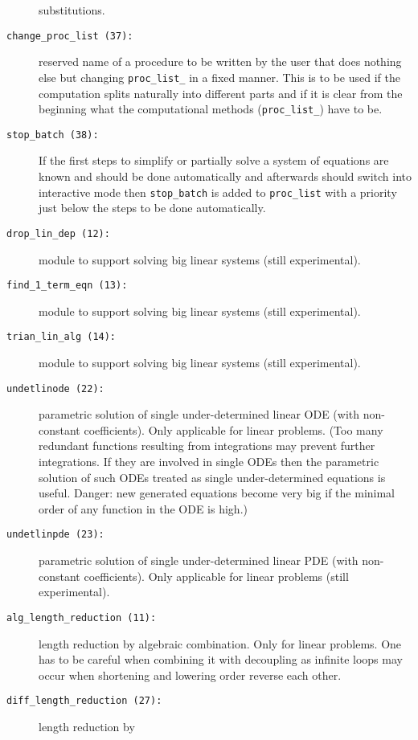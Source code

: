 \begin{description}
  substitutions.
  \label{crack-m_37}
\item[\texttt{change\_proc\_list (37):}] reserved name of a procedure
  to be written by the user that does nothing else but changing
  \texttt{proc\_list\_} in a fixed manner.  This is to be used if the
  computation splits naturally into different parts and if it is clear
  from the beginning what the computational methods
  (\texttt{proc\_list\_}) have to be.
  \label{crack-m_38}
\item[\texttt{stop\_batch (38):}] If the first steps to simplify or
  partially solve a system of equations are known and should be done
  automatically and afterwards  should switch into
  interactive mode then \texttt{stop\_batch} is added to
  \texttt{proc\_list} with a priority just below the steps to be done
  automatically.
  \label{crack-m_12}
\item[\texttt{drop\_lin\_dep (12):}] module to support solving big
  linear systems (still experimental).
  \label{crack-m_13}
\item[\texttt{find\_1\_term\_eqn (13):}] module to support solving big
  linear systems (still experimental).
  \label{crack-m_14}
\item[\texttt{trian\_lin\_alg (14):}] module to support solving big
  linear systems (still experimental).
  \label{crack-m_22}
\item[\texttt{undetlinode (22):}] parametric solution of single
  under-determined linear ODE (with non-constant coefficients).  Only
  applicable for linear problems.  (Too many redundant functions
  resulting from integrations may prevent further integrations.  If
  they are involved in single ODEs then the parametric solution of
  such ODEs treated as single under-determined equations is useful.
  Danger: new generated equations become very big if the minimal order
  of any function in the ODE is high.)
  \label{crack-m_23}
\item[\texttt{undetlinpde (23):}] parametric solution of single
  under-determined linear PDE (with non-constant coefficients).  Only
  applicable for linear problems (still experimental).
  \label{crack-m_11}
\item[\texttt{alg\_length\_reduction (11):}] length reduction by
  algebraic combination.  Only for linear problems.  One has to be
  careful when combining it with decoupling as infinite loops may
  occur when shortening and lowering order reverse each other.
  \label{crack-m_27}
\item[\texttt{diff\_length\_reduction (27):}] length reduction by

\end{description}
